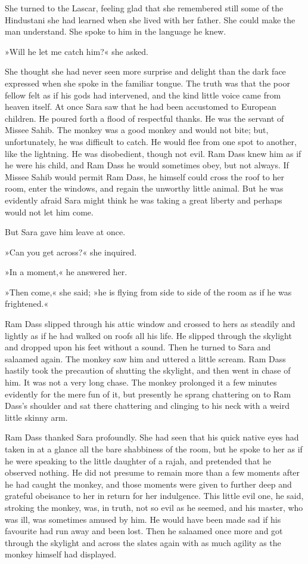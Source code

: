 She turned to the Lascar, feeling glad that she remembered still some of the Hindustani she had learned when she lived with her father. She could make the man understand. She spoke to him in the language he knew.

»Will he let me catch him?« she asked.

She thought she had never seen more surprise and delight than the dark face expressed when she spoke in the familiar tongue. The truth was that the poor fellow felt as if his gods had intervened, and the kind little voice came from heaven itself. At once Sara saw that he had been accustomed to European children. He poured forth a flood of respectful thanks. He was the servant of Missee Sahib. The monkey was a good monkey and would not bite; but, unfortunately, he was difficult to catch. He would flee from one spot to another, like the lightning. He was disobedient, though not evil. Ram Dass knew him as if he were his child, and Ram Dass he would sometimes obey, but not always. If Missee Sahib would permit Ram Dass, he himself could cross the roof to her room, enter the windows, and regain the unworthy little animal. But he was evidently afraid Sara might think he was taking a great liberty and perhaps would not let him come.

But Sara gave him leave at once.

»Can you get across?« she inquired.

»In a moment,« he answered her.

»Then come,« she said; »he is flying from side to side of the room as if he was frightened.«

Ram Dass slipped through his attic window and crossed to hers as steadily and lightly as if he had walked on roofs all his life. He slipped through the skylight and dropped upon his feet without a sound. Then he turned to Sara and salaamed again. The monkey saw him and uttered a little scream. Ram Dass hastily took the precaution of shutting the skylight, and then went in chase of him. It was not a very long chase. The monkey prolonged it a few minutes evidently for the mere fun of it, but presently he sprang chattering on to Ram Dass's shoulder and sat there chattering and clinging to his neck with a weird little skinny arm.

Ram Dass thanked Sara profoundly. She had seen that his quick native eyes had taken in at a glance all the bare shabbiness of the room, but he spoke to her as if he were speaking to the little daughter of a rajah, and pretended that he observed nothing. He did not presume to remain more than a few moments after he had caught the monkey, and those moments were given to further deep and grateful obeisance to her in return for her indulgence. This little evil one, he said, stroking the monkey, was, in truth, not so evil as he seemed, and his master, who was ill, was sometimes amused by him. He would have been made sad if his favourite had run away and been lost. Then he salaamed once more and got through the skylight and across the slates again with as much agility as the monkey himself had displayed.

